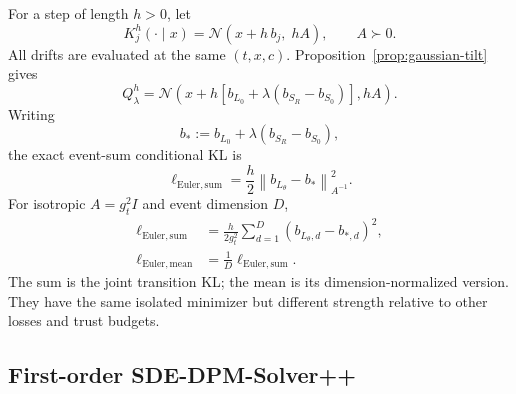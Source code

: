\documentclass[11pt,a4paper]{article}
\newcommand{\N}{\mathcal{N}}
\newcommand{\norm}[1]{\left\lVert #1 \right\rVert}
\newcommand{\Sbase}{S_0}
\newcommand{\Srl}{S_R}
\newcommand{\Lbase}{L_0}
\newcommand{\Lactor}{L_\theta}
\theoremstyle{plain}
\theoremstyle{definition}
\begin{document}
For a step of length $h>0$, let
\begin{equation}
K_j^h(\cdot\mid x)
=
\N(x+h\,b_j,\;hA),
\qquad
A\succ0.
\label{eq:euler-sde-kernel}
\end{equation}
All drifts are evaluated at the same $(t,x,c)$.  Proposition~\ref{prop:gaussian-tilt} gives
\begin{equation}
Q_\lambda^h
=
\N\!\left(
x+h[b_{\Lbase}+\lambda(b_{\Srl}-b_{\Sbase})],
hA
\right).
\label{eq:euler-target}
\end{equation}
Writing
\begin{equation}
b_*:=b_{\Lbase}+\lambda(b_{\Srl}-b_{\Sbase}),
\end{equation}
the exact event-sum conditional KL is
\begin{equation}
\ell_{\mathrm{Euler,sum}}
=
\frac{h}{2}
\norm{b_{\Lactor}-b_*}_{A^{-1}}^2.
\label{eq:euler-sde-kl}
\end{equation}
For isotropic $A=g_t^2I$ and event dimension $D$,
\begin{align}
\ell_{\mathrm{Euler,sum}}
&=
\frac{h}{2g_t^2}
\sum_{d=1}^D
(b_{\Lactor,d}-b_{*,d})^2,
\label{eq:euler-sum}\\
\ell_{\mathrm{Euler,mean}}
&=
\frac1D\ell_{\mathrm{Euler,sum}}.
\label{eq:euler-mean}
\end{align}
The sum is the joint transition KL; the mean is its dimension-normalized version.  They have the
same isolated minimizer but different strength relative to other losses and trust budgets.

\subsection{First-order SDE-DPM-Solver++}
\end{document}
